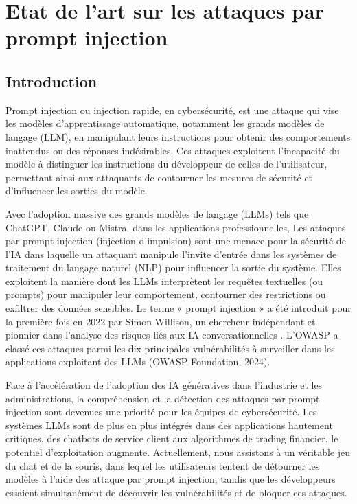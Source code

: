 \chapter{Etat de l'art sur les attaques par prompt injection}
\vspace{2 cm}
\section*{Introduction}
Prompt injection ou injection rapide, en cybersécurité, est une attaque qui vise les modèles d'apprentissage automatique, notamment les grands modèles de langage (LLM), en manipulant leurs instructions pour obtenir des comportements inattendus ou des réponses indésirables. Ces attaques exploitent l'incapacité du modèle à distinguer les instructions du développeur de celles de l'utilisateur, permettant ainsi aux attaquants de contourner les mesures de sécurité et d'influencer les sorties du modèle. 

Avec l’adoption massive des grands modèles de langage (LLMs) tels que ChatGPT, Claude ou Mistral dans les applications professionnelles, Les attaques par prompt injection (injection d’impulsion) sont une menace pour la sécurité de l’IA dans laquelle un attaquant manipule l’invite d’entrée dans les systèmes de traitement du langage naturel (NLP) pour influencer la sortie du système. Elles exploitent la manière dont les LLMs interprètent les requêtes textuelles (ou prompts) pour manipuler leur comportement, contourner des restrictions ou exfiltrer des données sensibles. Le terme « prompt injection » a été introduit pour la première fois en 2022 par Simon Willison, un chercheur indépendant et pionnier dans l’analyse des risques liés aux IA conversationnelles \cite{willison_prompt_nodate}. L’OWASP a classé ces attaques parmi les dix principales vulnérabilités à surveiller dans les applications exploitant des LLMs (OWASP Foundation, 2024)\cite{fasha_mitigating_2024}.

Face à l'accélération de l'adoption des IA génératives dans l'industrie et les administrations, la compréhension et la détection des attaques par prompt injection sont devenues une priorité pour les équipes de cybersécurité. Les systèmes LLMs sont de plus en plus intégrés dans des applications hautement critiques, des chatbots de service client aux algorithmes de trading financier, le potentiel d’exploitation augmente. Actuellement, nous assistons à un véritable jeu du chat et de la souris, dans lequel les utilisateurs tentent de détourner les modèles à l’aide des attaque par prompt injection, tandis que les développeurs essaient simultanément de découvrir les vulnérabilités et de bloquer ces attaques.

